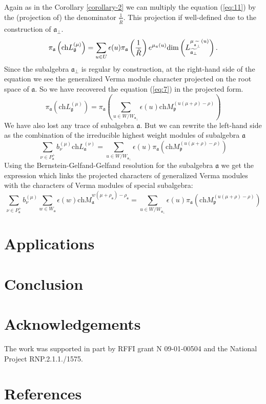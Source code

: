 \documentclass[12pt]{article}
\theoremstyle{definition}
\newcommand{\gf}{\mathfrak{g}}
\newcommand{\af}{\mathfrak{a}}
\newcommand{\afb}{\mathfrak{a}_{\bot}}
\newcommand{\pf}{\mathfrak{p}}
\begin{document}
\begin{enumerate}
Again as in the Corollary \ref{corollary-2} we can multiply the equation (\ref{eq:11}) by the (projection of) the denominator $\frac{1}{\tilde R}$. This projection if well-defined due to the construction of $\afb$.
\begin{equation}
  \label{eq:12}
  \pi_{\af}\left(\mathrm{ch} L^{(\mu)}_{\gf}\right)= \sum_{u\in U}\epsilon(u) \pi_{\af}\left(\frac{1}{\tilde R}\right) e^{\mu_{\af}(u)}\mathrm{dim} \left( L_{\widetilde{\af_{\perp }}}^{\mu _{%
\widetilde{\af_{\perp }}}\left( u\right) }\right) .
\end{equation}
Since the subalgebra $\afb$ is regular by construction,  at the right-hand side of the equation we see the generalized Verma module character projected on the root space of $\af$. So we have recovered the equation (\ref{eq:7}) in the projected form.
\begin{equation}
  \label{eq:13}
   \pi_{\af}\left(\mathrm{ch} L^{(\mu)}_{\gf}\right)= \pi_{\af}\left(  \sum_{u \in W/W_{\afb}} \epsilon(u) \mathrm{ch} M^{(u(\mu+\rho)-\rho)}_{\pf}\right)
\end{equation}
We have also lost any trace of subalgebra $\af$. But we can rewrite the left-hand side as the combination of the irreducible highest weight modules of subalgebra $\af$
\begin{equation}
  \label{eq:14}
  \sum_{\nu\in P^{+}_{\af}} b^{(\mu)}_{\nu} \mathrm{ch} L^{(\nu)}_{\af}= \sum_{u \in W/W_{\afb}} \epsilon(u) \pi_{\af}\left(   \mathrm{ch} M^{(u(\mu+\rho)-\rho)}_{\pf}\right)
\end{equation}
Using the Bernstein-Gelfand-Gelfand resolution for the subalgebra $\af$ we get the expression which links the projected characters of generalized Verma modules with the characters of Verma modules of special subalgebra:
\begin{equation}
  \label{eq:15}
  \sum_{\nu\in P^+_{\af}}b^{(\mu)}_{\nu}\sum_{ w\in W_{\af}} \epsilon(w) \mathrm{ch} M_{\af}^{w(\mu+\rho_{\af})-\rho_{\af}} =  \sum_{u \in W/W_{\afb}} \epsilon(u) \pi_{\af}\left(   \mathrm{ch} M^{(u(\mu+\rho)-\rho)}_{\pf}\right)
\end{equation}

\end{enumerate}

\section{Applications}
\label{sec:applications}

\section{Conclusion}
\label{sec:conclusion}


\section{Acknowledgements}

The work was supported in part by RFFI grant N 09-01-00504 and the National
Project RNP.2.1.1./1575.

\section*{References}
{}

\end{document}

